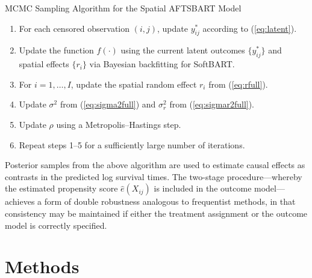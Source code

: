 \documentclass[useAMS,referee]{biom}
\begin{document}
\begin{algorithm}[H]
\caption{MCMC Sampling Algorithm for the Spatial AFTSBART Model}\label{alg:msamp}
\begin{enumerate}
    \item For each censored observation $(i,j)$, update $y_{ij}^\ast$ according to (\ref{eq:latent}).
    \item Update the function $f(\cdot)$ using the current latent outcomes $\{y_{ij}^\ast\}$ and spatial effects $\{r_i\}$ via Bayesian backfitting for SoftBART.
    \item For $i=1,\ldots,I$, update the spatial random effect $r_i$ from (\ref{eq:rfull}).
    \item Update $\sigma^2$ from (\ref{eq:sigma2full}) and $\sigma_r^2$ from (\ref{eq:sigmar2full}).
    \item Update $\rho$ using a Metropolis--Hastings step.
    \item Repeat steps 1--5 for a sufficiently large number of iterations.
\end{enumerate}
\end{algorithm}

Posterior samples from the above algorithm are used to estimate causal effects as contrasts in the predicted log survival times. The two-stage procedure—whereby the estimated propensity score $\hat{e}(X_{ij})$ is included in the outcome model—achieves a form of double robustness analogous to frequentist methods, in that consistency may be maintained if either the treatment assignment or the outcome model is correctly specified.














\section{Methods}
\end{document}
